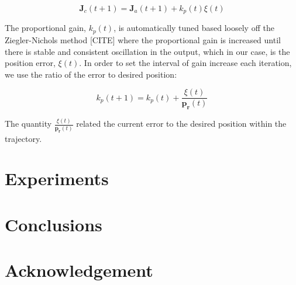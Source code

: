 \documentclass[letterpaper, 10 pt, conference]{ieeeconf}  %
\begin{document}
\begin{equation}
    \mathbf{J}_c(t+1) = \mathbf{J}_a(t+1) + k_p(t)\xi(t)
\end{equation}

The proportional gain, $k_p(t)$, is automatically tuned based loosely off the Ziegler-Nichols method [CITE] where the proportional gain is increased until there is stable and consistent oscillation in the output, which in our case, is the position error, $\xi(t)$. In order to set the interval of gain increase each iteration, we use the ratio of the error to desired position:

\begin{equation}
    k_p(t+1) = k_p(t) + \frac{\xi(t)}{\mathbf{p_r}(t)}
\end{equation}

The quantity $\frac{\xi(t)}{\mathbf{p_r}(t)}$ related the current error to the desired position within the trajectory. 




\section{Experiments} \label{sec:exper}




\section{Conclusions} \label{sec:conc}

\section{Acknowledgement}


\addtolength{\textheight}{-12cm}   %
\end{document}
